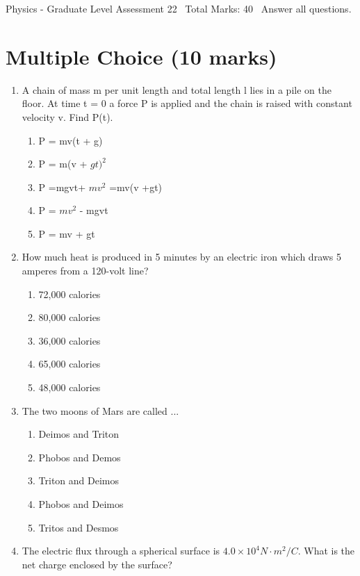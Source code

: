 \documentclass[12pt]{article}
\begin{document}
\begin{center}
Physics - Graduate Level Assessment 22 \
Total Marks: 40 \
Answer all questions.
\end{center}

\section*{Multiple Choice (10 marks)}
\begin{enumerate}[label=\arabic*.]
\item A chain of mass m per unit length and total length l lies in a pile on the floor. At time t = 0 a force P is applied and the chain is raised with constant velocity v. Find P(t).
\begin{enumerate}[label=(\alph*)]
    \item P = mv(t + g)
    \item P = m(v + $gt)^2$
    \item P =mgvt+ $mv^2$ =mv(v +gt)
    \item P = $mv^2$ - mgvt
    \item P = mv + gt
\end{enumerate}
\item How much heat is produced in 5 minutes by an electric iron which draws 5 amperes from a 120-volt line?
\begin{enumerate}[label=(\alph*)]
    \item 72,000 calories
    \item 80,000 calories
    \item 36,000 calories
    \item 65,000 calories
    \item 48,000 calories
\end{enumerate}
\item The two moons of Mars are called ...
\begin{enumerate}[label=(\alph*)]
    \item Deimos and Triton
    \item Phobos and Demos
    \item Triton and Deimos
    \item Phobos and Deimos
    \item Tritos and Desmos
\end{enumerate}
\item The electric flux through a spherical surface is $4.0\times 10^4 N \cdot m^2/C$. What is the net charge enclosed by the surface?
\begin{enumerate}[label=(\alph*)]

\end{enumerate}
\end{enumerate}
\end{document}
